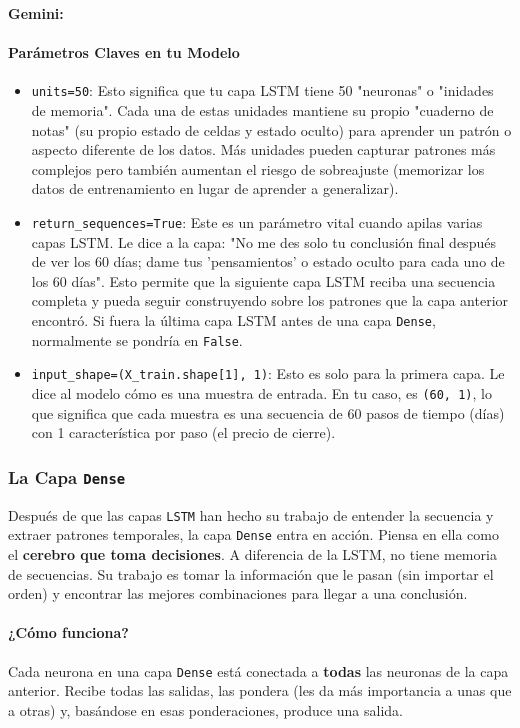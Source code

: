 \documentclass[12pt, a4paper]{article}
\newenvironment{gemini}{\par\noindent\textbf{Gemini:}\par\ignorespaces}{\par}
\begin{document}
\begin{gemini}
\paragraph{Parámetros Claves en tu Modelo}
\begin{itemize}
    \item \texttt{units=50}: Esto significa que tu capa LSTM tiene 50 "neuronas" o 
    "inidades de memoria". Cada una de estas unidades mantiene su propio 
    "cuaderno de notas" (su propio estado de celdas y estado oculto) para aprender
    un patrón o aspecto diferente de los datos. Más unidades pueden capturar patrones
    más complejos pero también aumentan el riesgo de sobreajuste (memorizar los
    datos de entrenamiento en lugar de aprender a generalizar).
    \item \texttt{return\_sequences=True}: Este es un parámetro vital cuando apilas 
    varias capas LSTM. Le dice a la capa: "No me des solo tu conclusión final después de 
    ver los 60 días; dame tus 'pensamientos' o estado oculto para cada uno de los 60 días". 
    Esto permite que la siguiente capa LSTM reciba una secuencia completa y pueda seguir 
    construyendo sobre los patrones que la capa anterior encontró. Si fuera la última capa 
    LSTM antes de una capa \texttt{Dense}, normalmente se pondría en \texttt{False}.
    \item \texttt{input\_shape=(X\_train.shape[1], 1)}: Esto es solo para la primera capa. 
    Le dice al modelo cómo es una muestra de entrada. En tu caso, es \texttt{(60, 1)}, lo que 
    significa que cada muestra es una secuencia de 60 pasos de tiempo (días) con 1 característica 
    por paso (el precio de cierre).
\end{itemize}

\subsubsection{La Capa \texttt{Dense}}
Después de que las capas \texttt{LSTM} han hecho su trabajo de entender la secuencia y
extraer patrones temporales, la capa \texttt{Dense} entra en acción. Piensa en ella como el 
\textbf{cerebro que toma decisiones}. A diferencia de la LSTM, no tiene memoria de secuencias. 
Su trabajo es tomar la información que le pasan (sin importar el orden) y encontrar las 
mejores combinaciones para llegar a una conclusión.

\paragraph{¿Cómo funciona?}
Cada neurona en una capa \texttt{Dense} está conectada a \textbf{todas} las neuronas de 
la capa anterior. Recibe todas las salidas, las pondera (les da más importancia a unas 
que a otras) y, basándose en esas ponderaciones, produce una salida.


\end{gemini}
\end{document}
